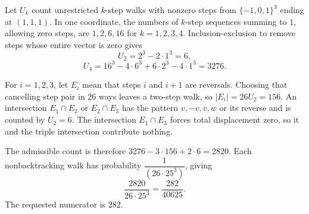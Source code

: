 Let $U_k$ count unrestricted $k$-step walks with nonzero steps from $\{-1,0,1\}^3$ ending at $(1,1,1)$. In one coordinate, the numbers of $k$-step sequences summing to $1$, allowing zero steps, are $1,2,6,16$ for $k=1,2,3,4$. Inclusion-exclusion to remove steps whose entire vector is zero gives
\[
U_2=2^3-2\cdot1^3=6,
\]
\[
U_4=16^3-4\cdot6^3+6\cdot2^3-4\cdot1^3=3276.
\]

For $i=1,2,3$, let $E_i$ mean that steps $i$ and $i+1$ are reversals. Choosing that cancelling step pair in $26$ ways leaves a two-step walk, so $|E_i|=26U_2=156$. An intersection $E_1\cap E_2$ or $E_2\cap E_3$ has the pattern $v,-v,v,w$ or its reverse and is counted by $U_2=6$. The intersection $E_1\cap E_3$ forces total displacement zero, so it and the triple intersection contribute nothing.

The admissible count is therefore $3276-3\cdot156+2\cdot6=2820$. Each nonbacktracking walk has probability $\dfrac{1}{(26\cdot25^3)}$, giving
\[
\dfrac{2820}{26\cdot25^3}=\dfrac{282}{40625}.
\]
The requested numerator is $\boxed{282}$.
